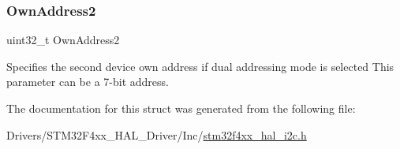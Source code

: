 \subsubsection{\texorpdfstring{Own\+Address2}{OwnAddress2}}
{\footnotesize\ttfamily uint32\+\_\+t Own\+Address2}

Specifies the second device own address if dual addressing mode is selected This parameter can be a 7-\/bit address. 

The documentation for this struct was generated from the following file\+:\begin{DoxyCompactItemize}
\item 
Drivers/\+S\+T\+M32\+F4xx\+\_\+\+H\+A\+L\+\_\+\+Driver/\+Inc/\mbox{\hyperlink{stm32f4xx__hal__i2c_8h}{stm32f4xx\+\_\+hal\+\_\+i2c.\+h}}\end{DoxyCompactItemize}
